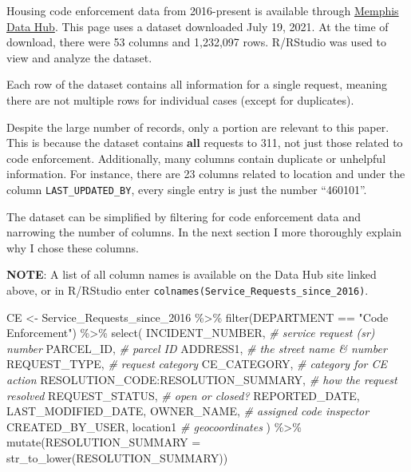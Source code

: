 \documentclass[
]{book}
\newenvironment{Shaded}{\begin{snugshade}}{\end{snugshade}}
\newcommand{\AttributeTok}[1]{\textcolor[rgb]{0.77,0.63,0.00}{#1}}
\newcommand{\CommentTok}[1]{\textcolor[rgb]{0.56,0.35,0.01}{\textit{#1}}}
\newcommand{\FunctionTok}[1]{\textcolor[rgb]{0.00,0.00,0.00}{#1}}
\newcommand{\NormalTok}[1]{#1}
\newcommand{\OtherTok}[1]{\textcolor[rgb]{0.56,0.35,0.01}{#1}}
\newcommand{\SpecialCharTok}[1]{\textcolor[rgb]{0.00,0.00,0.00}{#1}}
\newcommand{\StringTok}[1]{\textcolor[rgb]{0.31,0.60,0.02}{#1}}
\begin{document}
Housing code enforcement data from 2016-present is available through \href{https://data.memphistn.gov/dataset/Service-Requests-since-2016/hmd4-ddta}{Memphis Data Hub}. This page uses a dataset downloaded July 19, 2021. At the time of download, there were 53 columns and 1,232,097 rows. R/RStudio was used to view and analyze the dataset.

Each row of the dataset contains all information for a single request, meaning there are not multiple rows for individual cases (except for duplicates).

Despite the large number of records, only a portion are relevant to this paper. This is because the dataset contains \textbf{all} requests to 311, not just those related to code enforcement. Additionally, many columns contain duplicate or unhelpful information. For instance, there are 23 columns related to location and under the column \texttt{LAST\_UPDATED\_BY}, every single entry is just the number ``460101''.

The dataset can be simplified by filtering for code enforcement data and narrowing the number of columns. In the next section I more thoroughly explain why I chose these columns.

\textbf{NOTE}: A list of all column names is available on the Data Hub site linked above, or in R/RStudio enter \texttt{colnames(Service\_Requests\_since\_2016)}.

\begin{Shaded}
\begin{Highlighting}[]
\NormalTok{CE }\OtherTok{\textless{}{-}}\NormalTok{ Service\_Requests\_since\_2016 }\SpecialCharTok{\%\textgreater{}\%}
  \FunctionTok{filter}\NormalTok{(DEPARTMENT }\SpecialCharTok{==} \StringTok{"Code Enforcement"}\NormalTok{) }\SpecialCharTok{\%\textgreater{}\%}
  \FunctionTok{select}\NormalTok{(}
\NormalTok{    INCIDENT\_NUMBER, }\CommentTok{\#\textquotesingle{} service request (sr) number}
\NormalTok{    PARCEL\_ID, }\CommentTok{\#\textquotesingle{} parcel ID}
\NormalTok{    ADDRESS1, }\CommentTok{\#\textquotesingle{} the street name \& number}
\NormalTok{    REQUEST\_TYPE, }\CommentTok{\#\textquotesingle{} request category}
\NormalTok{    CE\_CATEGORY, }\CommentTok{\#\textquotesingle{} category for CE action}
\NormalTok{    RESOLUTION\_CODE}\SpecialCharTok{:}\NormalTok{RESOLUTION\_SUMMARY, }\CommentTok{\#\textquotesingle{} how the request resolved}
\NormalTok{    REQUEST\_STATUS, }\CommentTok{\#\textquotesingle{} open or closed?}
\NormalTok{    REPORTED\_DATE, }
\NormalTok{    LAST\_MODIFIED\_DATE, }
\NormalTok{    OWNER\_NAME, }\CommentTok{\#\textquotesingle{} assigned code inspector}
\NormalTok{    CREATED\_BY\_USER,}
\NormalTok{    location1 }\CommentTok{\#\textquotesingle{} geocoordinates}
\NormalTok{  ) }\SpecialCharTok{\%\textgreater{}\%} \FunctionTok{mutate}\NormalTok{(}\AttributeTok{RESOLUTION\_SUMMARY =} \FunctionTok{str\_to\_lower}\NormalTok{(RESOLUTION\_SUMMARY))}
\end{Highlighting}
\end{Shaded}
\end{document}
